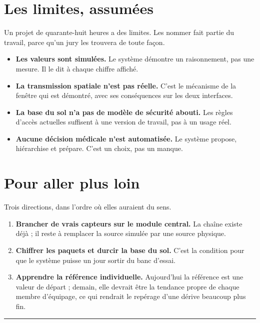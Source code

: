 \documentclass[11pt,a4paper]{article}
\let\sectionorig\section
\renewcommand{\section}{\Needspace{5\baselineskip}\sectionorig}
\begin{document}
\section{Les limites, assum\'ees}

Un projet de quarante-huit heures a des limites. Les nommer fait partie du travail, parce qu'un jury
les trouvera de toute fa\c{c}on.

\begin{itemize}
  \item \textbf{Les valeurs sont simul\'ees.} Le syst\`eme d\'emontre un raisonnement, pas une
        mesure. Il le dit \`a chaque chiffre affich\'e.
  \item \textbf{La transmission spatiale n'est pas r\'eelle.} C'est le m\'ecanisme de la fen\^etre qui
        est d\'emontr\'e, avec ses cons\'equences sur les deux interfaces.
  \item \textbf{La base du sol n'a pas de mod\`ele de s\'ecurit\'e abouti.} Les r\`egles d'acc\`es
        actuelles suffisent \`a une version de travail, pas \`a un usage r\'eel.
  \item \textbf{Aucune d\'ecision m\'edicale n'est automatis\'ee.} Le syst\`eme propose, hi\'erarchise
        et pr\'epare. C'est un choix, pas un manque.
\end{itemize}

\section{Pour aller plus loin}

Trois directions, dans l'ordre o\`u elles auraient du sens.

\begin{enumerate}
  \item \textbf{Brancher de vrais capteurs sur le module central.} La cha\^ine existe d\'ej\`a ; il
        reste \`a remplacer la source simul\'ee par une source physique.
  \item \textbf{Chiffrer les paquets et durcir la base du sol.} C'est la condition pour que le
        syst\`eme puisse un jour sortir du banc d'essai.
  \item \textbf{Apprendre la r\'ef\'erence individuelle.} Aujourd'hui la r\'ef\'erence est une valeur
        de d\'epart ; demain, elle devrait \^etre la tendance propre de chaque membre d'\'equipage,
        ce qui rendrait le rep\'erage d'une d\'erive beaucoup plus fin.
\end{enumerate}

\vspace{0.5cm}
\noindent\rule{\textwidth}{0.4pt}
\vspace{0.25cm}

\end{document}

